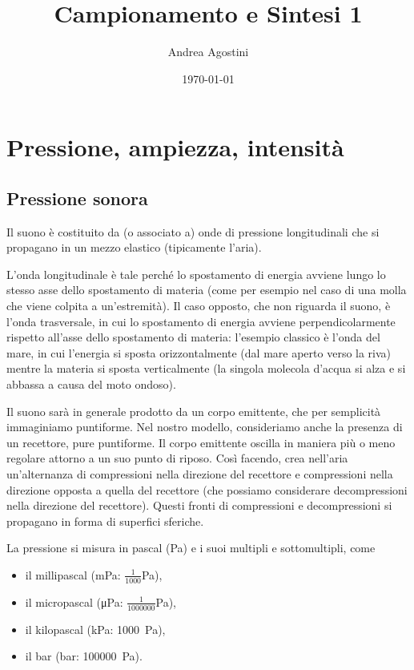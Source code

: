 \documentclass[11pt]{report}
\begin{document}
\title{Campionamento e Sintesi 1}


\author{Andrea Agostini}
\date{\today}
\maketitle

\chapter{Pressione, ampiezza, intensità}

\section{Pressione sonora}

Il suono è costituito da (o associato a) onde di pressione longitudinali che si propagano in un mezzo elastico (tipicamente l'aria).

L'onda longitudinale è tale perché lo spostamento di energia avviene lungo lo stesso asse dello spostamento di materia (come per esempio nel caso di una molla che viene colpita a un'estremità). Il caso opposto, che non riguarda il suono, è l'onda trasversale, in cui lo spostamento di energia avviene perpendicolarmente rispetto all'asse dello spostamento di materia: l'esempio classico è l'onda del mare, in cui l'energia si sposta orizzontalmente (dal mare aperto verso la riva) mentre la materia si sposta verticalmente (la singola molecola d'acqua si alza e si abbassa a causa del moto ondoso).

Il suono sarà in generale prodotto da un corpo emittente, che per semplicità immaginiamo puntiforme. Nel nostro modello, consideriamo anche la presenza di un recettore, pure puntiforme. Il corpo emittente oscilla in maniera più o meno regolare attorno a un suo punto di riposo. Così facendo, crea nell'aria un'alternanza di compressioni nella direzione del recettore e compressioni nella direzione opposta a quella del recettore (che possiamo considerare decompressioni nella direzione del recettore). Questi fronti di compressioni e decompressioni si propagano in forma di superfici sferiche. 

La pressione si misura in pascal (\unit{Pa}) e i suoi multipli e sottomultipli, come 
\begin{itemize}
\item il millipascal (\unit{mPa}: $\frac{1}{1000}$\unit{Pa}), 
\item il micropascal (\unit{\micro\pascal}: $\frac{1}{1000000}$\unit{Pa}), 
\item il kilopascal (\unit{\kilo\pascal}: \qty{1000}{Pa}),
\item il \unit{bar} (\unit{bar}: \qty{100000}{Pa}).
\end{itemize}
\end{document}
